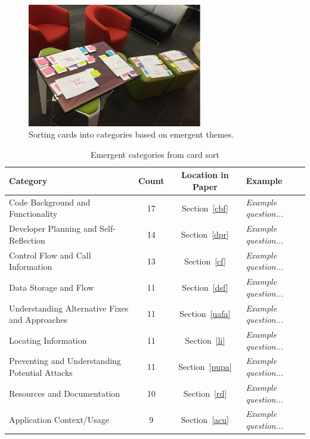 \documentclass[conference]{IEEEtran}
\begin{document}
\begin{figure}
\centering
\includegraphics[width=3in]{Images/categories.pdf}
\caption{Sorting cards into categories based on emergent themes.}
\label{fig:cardsort} 
\end{figure}


\begin{table} 
\centering
\caption{Emergent categories from card sort}
\begin{tabular}{|l|c|c|l|}
\rowcolor{gray!50}
\hline
    Category											& Count		& Location in Paper			& Example 	\\
    \hline		
    Code Background and Functionality	 				& 17     	& Section~\ref{cbf}				& \emph{Example question...}			\\
    \hline
    Developer Planning and Self-Reflection				& 14    	& Section~\ref{dpr}				& \emph{Example question...}			\\
    \hline
    Control Flow and Call Information					& 13     	& Section~\ref{cf}				& \emph{Example question...}		\\
    \hline
    Data Storage and Flow								& 11     	& Section~\ref{dsf}				& \emph{Example question...}		\\
    \hline
    Understanding Alternative Fixes and Approaches		& 11     	& Section~\ref{uafa}			& \emph{Example question...}			\\
    \hline
    Locating Information 								& 11      	& Section~\ref{li}				& \emph{Example question...}			\\
    \hline
    Preventing and Understanding Potential Attacks		& 11     	& Section~\ref{pupa}			& \emph{Example question...}			\\
    \hline
    Resources and Documentation							& 10     	& Section~\ref{rd}				& \emph{Example question...}			\\
    \hline    
    Application Context/Usage							& 9     	& Section~\ref{acu}				& \emph{Example question...}			\\
    \hline

\end{tabular}
\end{table}
\end{document}
